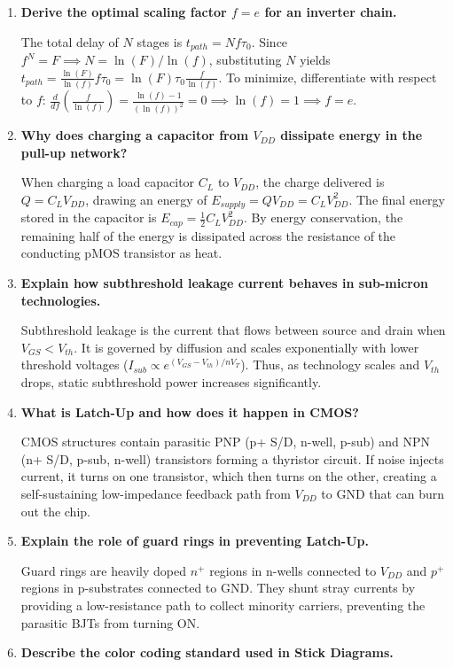 \documentclass[12pt,a4paper]{article}
\newcommand{\Q}[1]{\textbf{#1}\par\noindent\ignorespaces}
\begin{document}
\begin{tcolorbox}[exambox, title={\textbf{Frequently Asked / Viva Questions}}]
\begin{enumerate}[topsep=0pt, label=\textbf{Q\arabic*.}, itemsep=5pt]
  \item \Q{Derive the optimal scaling factor $f = e$ for an inverter chain.}
    The total delay of $N$ stages is $t_{path} = N f \tau_0$. Since $f^N = F \implies N = \ln(F)/\ln(f)$, substituting $N$ yields $t_{path} = \frac{\ln(F)}{\ln(f)} f \tau_0 = \ln(F) \tau_0 \frac{f}{\ln(f)}$. To minimize, differentiate with respect to $f$: $\frac{d}{d f}\left(\frac{f}{\ln(f)}\right) = \frac{\ln(f) - 1}{(\ln(f))^2} = 0 \implies \ln(f) = 1 \implies f = e$.
  \item \Q{Why does charging a capacitor from $V_{DD}$ dissipate energy in the pull-up network?}
    When charging a load capacitor $C_L$ to $V_{DD}$, the charge delivered is $Q = C_L V_{DD}$, drawing an energy of $E_{supply} = Q V_{DD} = C_L V_{DD}^2$. The final energy stored in the capacitor is $E_{cap} = \frac{1}{2} C_L V_{DD}^2$. By energy conservation, the remaining half of the energy is dissipated across the resistance of the conducting pMOS transistor as heat.
  \item \Q{Explain how subthreshold leakage current behaves in sub-micron technologies.}
    Subthreshold leakage is the current that flows between source and drain when $V_{GS} < V_{th}$. It is governed by diffusion and scales exponentially with lower threshold voltages ($I_{sub} \propto e^{(V_{GS}-V_{th})/n V_T}$). Thus, as technology scales and $V_{th}$ drops, static subthreshold power increases significantly.
  \item \Q{What is Latch-Up and how does it happen in CMOS?}
    CMOS structures contain parasitic PNP (p+ S/D, n-well, p-sub) and NPN (n+ S/D, p-sub, n-well) transistors forming a thyristor circuit. If noise injects current, it turns on one transistor, which then turns on the other, creating a self-sustaining low-impedance feedback path from $V_{DD}$ to GND that can burn out the chip.
  \item \Q{Explain the role of guard rings in preventing Latch-Up.}
    Guard rings are heavily doped $n^+$ regions in n-wells connected to $V_{DD}$ and $p^+$ regions in p-substrates connected to GND. They shunt stray currents by providing a low-resistance path to collect minority carriers, preventing the parasitic BJTs from turning ON.
  \item \Q{Describe the color coding standard used in Stick Diagrams.}

\end{enumerate}
\end{tcolorbox}
\end{document}
